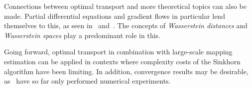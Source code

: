 Connections between optimal transport and more theoretical topics can also be made. Partial differential equations and gradient flows in particular lend themselves to this, as seen in\ \cite{Ambr2005} and\ \cite{San2015}. The concepts of \textit{Wasserstein distances} and \textit{Wasserstein spaces} play a predominant role in this.

Going forward, optimal transport in combination with large-scale mapping estimation can be applied in contexts where complexity costs of the Sinkhorn algorithm have been limiting. In addition, convergence results may be desirable, as\ \cite{Seg2018} have so far only performed numerical experiments.



